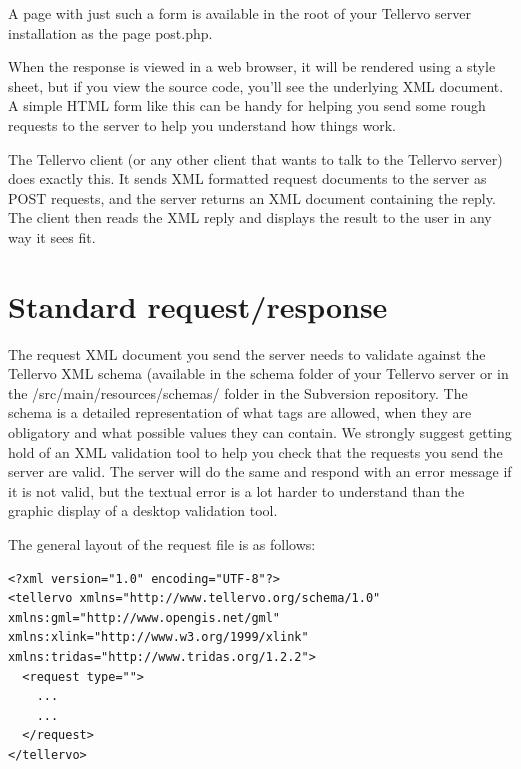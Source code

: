 A page with just such a form is available in the root of your Tellervo server installation as the page post.php.

When the response is viewed in a web browser, it will be rendered using a style sheet, but if you view the source code, you'll see the underlying XML document.  A simple HTML form like this can be handy for helping you send some rough requests to the server to help you understand how things work.

The Tellervo client (or any other client that wants to talk to the Tellervo server) does exactly this.  It sends XML formatted request documents to the server as POST requests, and the server returns an XML document containing the reply.  The client then reads the XML reply and displays the result to the user in any way it sees fit.


\section{Standard request/response}

The request XML document you send the server needs to validate against the Tellervo XML schema (available in the schema folder of your Tellervo server or in the /src/main/resources/schemas/ folder in the Subversion repository.  The schema is a detailed representation of what tags are allowed, when they are obligatory and what possible values they can contain.  We strongly suggest getting hold of an XML validation tool to help you check that the requests you send the server are valid.  The server will do the same and respond with an error message if it is not valid, but the textual error is a lot harder to understand than the graphic display of a desktop validation tool.

The general layout of the request file is as follows:

\begin{lstlisting}
<?xml version="1.0" encoding="UTF-8"?>
<tellervo xmlns="http://www.tellervo.org/schema/1.0" xmlns:gml="http://www.opengis.net/gml" xmlns:xlink="http://www.w3.org/1999/xlink" xmlns:tridas="http://www.tridas.org/1.2.2">
  <request type="">
    ...
    ...
  </request>
</tellervo>
\end{lstlisting}



